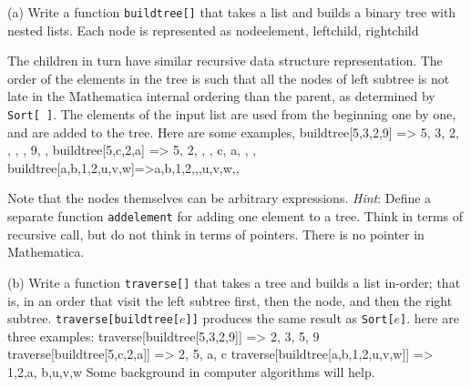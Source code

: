  (a) Write a function {\tt buildtree[]} that
takes a list and builds a binary tree with nested lists.  
Each node is represented as  
\ttbg
{ nodeelement, {leftchild}, {rightchild} }
\tted
\item{}The children in turn have similar recursive data structure 
representation.  The order of the elements in the tree is such that 
all the nodes of left subtree is not late in the
Mathematica internal ordering than the parent, as determined 
by {\tt Sort[ ]}. 
The elements of the input list are used from the beginning one
by one, and are added to the tree.  Here are some examples,
\ttbg
buildtree[{5,3,2,9}]  => {5, {3, {2, {}, {}}, {}}, {9, {}, {}}}
buildtree[{5,c,2,a}]  => {5, {2, {}, {}}, {c, {a, {}, {}}, {}}}
buildtree[{{a,b},{1,2},{u,v,w}}]=>{{a,b},{{1,2},{},{}},{{u,v,w},{},{}}}
\tted
\item{} Note that the nodes themselves can be arbitrary expressions. 
{\sl Hint}: Define a separate function {\tt addelement} for adding
one element to a tree.  Think in terms of recursive call, but do not think in
terms of pointers.  There is no pointer in Mathematica. 
\item{} (b) Write a function {\tt traverse[]} that takes a tree
and builds a list in-order; that is, in an order
that visit the left subtree first, then the node, and then the right
subtree.  {\tt traverse[buildtree[$e$]]} produces the same
result as {\tt Sort[$e$]}.  here are three examples:
\ttbg
traverse[buildtree[{5,3,2,9}]]  => {2, 3, 5, 9}
traverse[buildtree[{5,c,2,a}]]  => {2, 5, a, c}
traverse[buildtree[{{a,b},{1,2},{u,v,w}}]] => {{1,2},{a, b},{u,v,w}}
\tted
Some background in computer algorithms will help.

\bye
